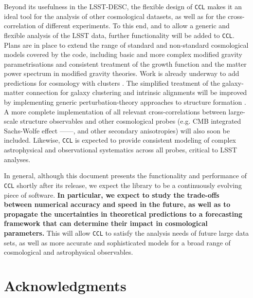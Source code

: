 \documentclass[\docopts]{\docclass}
\newcommand{\ccl}{{\tt CCL}\xspace}
\begin{document}
Beyond its usefulness in the LSST-DESC, the flexible design of \ccl makes it an ideal tool for the analysis of other cosmological datasets, as well as for the cross-correlation of different experiments. To this end, and to allow a generic and flexible analysis of the LSST data, further functionality will be added to \ccl. Plans are in place to extend the range of standard and non-standard cosmological models covered by the code, including basic and more complex modified gravity parametrisations \citep{Silvestri2013, Bellini2014} and consistent treatment of the growth function and the matter power spectrum in modified gravity theories. Work is already underway to add predictions for cosmology with clusters \citep{McClintock18}. The simplified treatment of the galaxy-matter connection for galaxy clustering and intrinsic alignments will be improved by implementing generic perturbation-theory approaches to structure formation \citep{FASTPT}. A more complete implementation of all relevant cross-correlations between large-scale structure observables and other cosmological probes (e.g. CMB integrated Sachs-Wolfe effect ---\citealt{1967ApJ...147...73S}---, and other secondary anisotropies) will also soon be included. Likewise, \ccl is expected to provide consistent modeling of complex astrophysical and observational systematics across all probes, critical to LSST analyses.

In general, although this document presents the functionality and performance of \ccl shortly after its release, we expect the library to be a continuously evolving piece of software. {\bf In particular, we expect to study the trade-offs between numerical accuracy and speed in the future, as well as to propagate the uncertainties in theoretical predictions to a forecasting framework that can determine their impact in cosmological parameters.} This will allow \ccl to satisfy the analysis needs of future large data sets, as well as more accurate and sophisticated models for a broad range of cosmological and astrophysical observables.

\section*{Acknowledgments}

\vskip 5pt


\vskip 5pt



\end{document}
